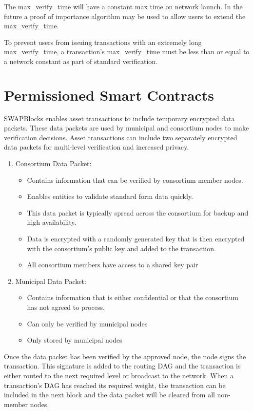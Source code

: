 \documentclass[12pt]{article}
\begin{document}
The max\_verify\_time will have a constant max time on network launch.  
In the future a proof of importance algorithm may be used to 
allow users to extend the max\_verify\_time.

To prevent users from issuing transactions with an extremely long max\_verify\_time, a 
transaction's max\_verify\_time
must be less than or equal to a network constant as part of standard verification.

\section{Permissioned Smart Contracts}

SWAPBlocks enables asset transactions to include temporary encrypted data packets. These data
packets are used by municipal and consortium nodes to make verification decisions.  Asset transactions
can include two separately encrypted data packets for multi-level verification and increased privacy.

\begin{enumerate}
	\item Consortium Data Packet:
		\begin{itemize}
			\item{Contains information that can be verified by consortium member
				nodes.}
			\item{Enables entities to validate standard form data quickly.} 
			\item{This data packet is typically spread across the consortium for backup
				and high availability.}
			\item{Data is encrypted with a randomly generated key that is then encrypted
				with the consortium's public key and added to the transaction.}
			\item{All consortium members have access to a shared key pair}	
		\end{itemize}
	\item Municipal Data Packet:
		\begin{itemize}
			\item{Contains information that is either confidential or that the
				consortium has not agreed to process.}
			\item{Can only be verified by municipal nodes}
			\item{Only stored by municipal nodes}
		\end{itemize}
\end{enumerate}

Once the data packet has been verified by the approved node, the node signs the 
transaction. This signature is added to the routing DAG and the transaction is either routed
		to the next required level or broadcast to the network.
When a transaction's DAG has reached 
its required weight, the transaction can be included in the next block and the data
		packet will be cleared from all non-member nodes.
\end{document}
